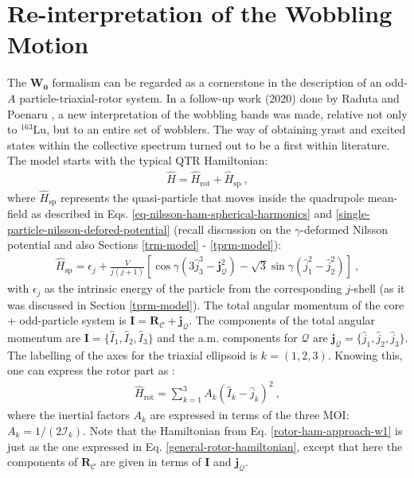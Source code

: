 \section{Re-interpretation of the Wobbling Motion}

The $\mathbf{W_0}$ formalism can be regarded as a cornerstone in the description of an odd-$A$ particle-triaxial-rotor system. In a follow-up work (2020) done by Raduta and Poenaru \cite{raduta2020approach,raduta2020towards}, a new interpretation of the wobbling bands was made, relative not only to $^{163}$Lu, but to an entire set of wobblers. The way of obtaining yrast and excited states within the collective spectrum turned out to be a first within literature. The model starts with the typical QTR Hamiltonian:
\begin{align}
    \hat{H}=\hat{H}_\text{rot}+\hat{H}_\text{sp}\ ,
    \label{total-ham-approach-w1}
\end{align}
where $\hat{H}_\text{sp}$ represents the quasi-particle that moves inside the quadrupole mean-field as described in Eqs. \ref{eq-nilsson-ham-spherical-harmonics} and \ref{single-particle-nilsson-defored-potential} (recall discussion on the $\gamma$-deformed Nilsson potential and also Sections \ref{trm-model} - \ref{tprm-model}):
\begin{align}
    \hat{H}_\text{sp}=\epsilon_j+\frac{V}{j(j+1)}\left[\cos\gamma\left(3\hat{j}_3^3-\mathbf{j}_\mathcal{Q}^2\right)-\sqrt{3}\sin\gamma\left(\hat{j}_1^2-\hat{j}_2^2\right)\right]\ ,
    \label{single-particle-ham-approach-w1}
\end{align}
with $\epsilon_j$ as the intrinsic energy of the particle from the corresponding $j$-shell (as it was discussed in Section \ref{tprm-model}). The total angular momentum of the core + odd-particle system is $\mathbf{I}=\mathbf{R}_\mathscr{C}+\mathbf{j}_{\mathcal{Q}}$. The components of the total angular momentum are $\mathbf{I}=\{\hat{I}_1,\hat{I}_2,\hat{I}_3\}$ and the a.m. components for $\mathcal{Q}$ are $\mathbf{j}_{\mathcal{Q}}=\{\hat{j}_1,\hat{j}_2,\hat{j}_3\}$. The labelling of the axes for the triaxial ellipsoid is $k=(1,2,3)$. Knowing this, one can express the rotor part as \cite{raduta2020approach}:
\begin{align}
    \hat{H}_\text{rot}=\sum_{k=1}^3A_k(\hat{I}_k-\hat{j}_k)^2\ ,
    \label{rotor-ham-approach-w1}
\end{align}
where the inertial factors $A_k$ are expressed in terms of the three MOI: $A_k=1/(2\mathcal{I}_k)$.
Note that the Hamiltonian from Eq. \ref{rotor-ham-approach-w1} is just as the one expressed in Eq. \ref{general-rotor-hamiltonian}, except that here the components of $\mathbf{R}_\mathscr{C}$ are given in terms of $\mathbf{I}$ and $\mathbf{j}_{\mathcal{Q}}$.

